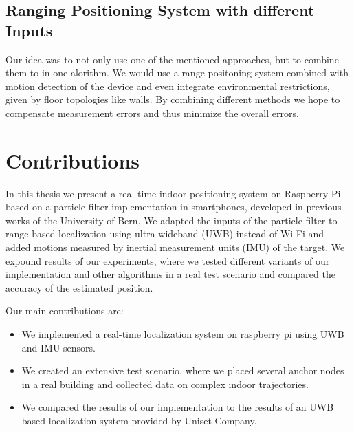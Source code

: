 \subsection{Ranging Positioning System with different Inputs}

Our idea was to not only use one of the mentioned approaches, but to combine them to in one alorithm. We would use a range positoning system combined with motion detection of the device and even integrate environmental restrictions, given by floor topologies like walls. By combining different methods we hope to compensate measurement errors and thus minimize the overall errors.



\section{Contributions}

In this thesis we present a real-time indoor positioning system on Raspberry Pi based on a particle filter implementation in smartphones, developed in previous works of the University of Bern. \cite{Carrera} We adapted the inputs of the particle filter to range-based localization using ultra wideband (UWB) instead of Wi-Fi and added motions measured by inertial measurement units (IMU) of the target.
We expound results of our experiments, where we tested different variants of our implementation and other algorithms in a real test scenario and compared the accuracy of the estimated position.

Our main contributions are:
\begin{itemize}
\item We implemented a real-time localization system on raspberry pi using UWB and IMU sensors. 
\item We created an extensive test scenario, where we placed several anchor nodes in a real building and collected data on complex indoor trajectories. 
\item We compared the results of our implementation to the results of an UWB based localization system provided by Uniset Company.
\end{itemize}




